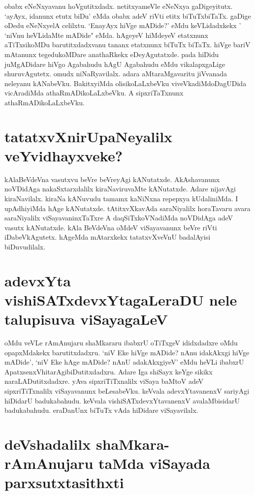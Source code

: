 obabx eNeNxyavanu hoVgutitxdadx. netitxyameVle eNeNxya gaDigeyitutx. `ayAyx, idanunx etutx biDu' eMda obabx adeV riVti etitx biTuTxbiTaTx. gaDige oDedu eNeNxyelA celilxtu. `EnayAyx hiVge mADide?' eMdu keVLidadxkekx ' `niVnu heVLidaMte mADide" eMda. hAgeyeV hiMdeyeV etatxnunx aTiTxsikoMDu barutitxdadxvanu tananx etatxnunx biTuTx biTaTx. hiVge bariV mAtanunx tegedukoMDare anathaRkekx eDeyAgutatxde. pada hiDidu juMgADidare hiVgo Agabahudu hAgU Agabahudu eMdu vikalapxgaLige shuruvAgutetx. omudx niNaRyavilalx. adara aMtaraMgavaritu jiVvanada neleyanu kANabeVku. BakitxyiMda olisikoLaLxbeVku viveVkadiMdoDagUDida vicAradiMda athaRmADikoLaLxbeVku. A sipxriTaTxnunx athaRmADikoLaLxbeVku.

\section*{tatatxvXnirUpaNeyalilx veYvidhayxveke?}

kAlaBeVdeVna vasutxvu beVre beVreyAgi kANutatxde. AkAshavanunx noVDidAga nakaSxtarxdalilx kiraNaviruvaMte kANutatxde. Adare nijavAgi kiraNavilalx. kiraNa kANuvudu tamamx kaNiNxna repepxya kUdaliniMda. I upAdhiyiMda hAge kANutatxde. tAtitxvXkavAda saraNiyalilx horaTavaru avara saraNiyalilx viSayavaninxTaTxre A daqSiTxkoVNadiMda noVDidAga adeV vasutx kANutatxde. kAla BeVdeVna oMdeV viSayavanunx beVre riVti iDabeVkAgutetx. hAgeMda mAtarxkekx tatatxvXveVnU badalAyisi biDuvudilalx.

\section*{adevxYta vishiSATxdevxYtagaLeraDU nele talupisuva viSayagaLeV}

oMdu veVLe rAmAnujaru shaMkararu ibabxrU oTiTxgeV ididxdadxre oMdu opapxMdakekx barutitxdadxru. `niV Eke hiVge mADide? nAnu idakAkxgi hiVge mADide', `niV Eke hAge mADide? nAnU adakAkxgiyeV' eMdu heVLi ibabxrU ApatxsenxVhitarAgibiDutitxdadxru. Adare Iga shiSayx keYge sikikx naraLADutitxdadxre. yAva sipxriTiTxnalilx viSaya baMtoV adeV sipxriTiTxnalilx viSayavanunx beLesabeVku. keVvala adevxYtavanenxV sariyAgi hiDidarU badukabahudu. keVvala vishiSATxdevxYtavanenxV avalaMbisidarU badukabahudu. eraDanUnx biTuTx vAda hiDidare viSayavilalx.

\section*{deVshadalilx shaMkara-rAmAnujaru taMda viSayada parxsutxtasithxti}

